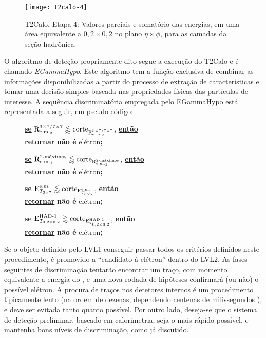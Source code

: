 \begin{enumerate}
\begin{figure}
\begin{center}
\texttt{[image: t2calo-4]}
\end{center}
\caption{T2Calo, Etapa 4: Valores parciais e somatório das energias, em uma
área equivalente a $0,2\times0,2$ no plano $\eta\times\phi$, para as camadas
da seção hadrônica.} 
\label{fig:t2calo-4}
\end{figure}

\end{enumerate}

O algoritmo de deteção propriamente dito segue a execução do T2Calo e é
chamado \emph{EGammaHypo}. Este algoritmo tem a função exclusiva de combinar
as informações disponibilizadas a partir do processo de extração de
características e tomar uma decisão simples baseada nas propriedades físicas
das partículas de interesse. A seqüência discriminatória empregada pelo
EGammaHypo está representada a seguir, em pseudo-código: 

\newcommand{\textbu}[1]{\textbf{\underline{#1}}}
\newcommand{\IF}[1]{\textbu{se} #1, \textbu{então}}
\newcommand{\RETURN}[1]{\\ \textbu{retornar} #1\textbf{;}}
\newcommand{\lumihi}{\ensuremath{10^{33} \text{cm}^{-2}\text{s}^{-1}}}

\begin{description}
\item[] \IF{$\rcore \lessapprox \text{corte}_{\rcore}$}
	\RETURN{\textbf{não é} elétron}

\item[] \IF{$\eratio \lessapprox \text{corte}_{\eratio}$}
	\RETURN{\textbf{não é} elétron}

\item[] \IF{$\etem \lessapprox \text{corte}_{\etem}$}
	\RETURN{\textbf{não é} elétron}

\item[] \IF{$\ethad \gtrapprox \text{corte}_{\ethad}$}
	\RETURN{\textbf{não é} elétron}

\end{description}

Se o objeto definido pelo LVL1 conseguir passar todos os critérios definidos
neste procedimento, é promovido a ``candidato à elétron'' dentro do LVL2. As
fases seguintes de discriminação tentarão encontrar um traço, com momento
equivalente a energia do , e uma nova rodada de hipóteses
confirmará (ou não) o possível elétron. A procura de traços nos detetores
internos é um procedimento tipicamente lento (na ordem de dezenas, dependendo
centenas de milissegundos \cite{hlt-tdr}), e deve ser evitada tanto quanto
possível. Por outro lado, deseja-se que o sistema de deteção preliminar,
baseado em calorimetria, seja o mais rápido possível, e mantenha bons níveis
de discriminação, como já discutido.

